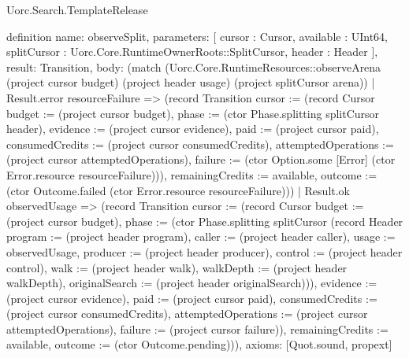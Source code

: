 \begin{lexlean}{Uorc.Search.TemplateRelease}
\begin{semanticmodule}
definition{
  name: observeSplit,
  parameters: [
    cursor : Cursor,
    available : UInt64,
    splitCursor : Uorc.Core.RuntimeOwnerRoots::SplitCursor,
    header : Header
  ],
  result: Transition,
  body: (match (Uorc.Core.RuntimeResources::observeArena (project cursor budget) (project header usage) (project splitCursor arena))
    | Result.error resourceFailure => (record Transition {cursor := (record Cursor {budget := (project cursor budget), phase := (ctor Phase.splitting splitCursor header), evidence := (project cursor evidence), paid := (project cursor paid), consumedCredits := (project cursor consumedCredits), attemptedOperations := (project cursor attemptedOperations), failure := (ctor Option.some [Error] (ctor Error.resource resourceFailure))}), remainingCredits := available, outcome := (ctor Outcome.failed (ctor Error.resource resourceFailure))})
    | Result.ok observedUsage => (record Transition {cursor := (record Cursor {budget := (project cursor budget), phase := (ctor Phase.splitting splitCursor (record Header {program := (project header program), caller := (project header caller), usage := observedUsage, producer := (project header producer), control := (project header control), walk := (project header walk), walkDepth := (project header walkDepth), originalSearch := (project header originalSearch)})), evidence := (project cursor evidence), paid := (project cursor paid), consumedCredits := (project cursor consumedCredits), attemptedOperations := (project cursor attemptedOperations), failure := (project cursor failure)}), remainingCredits := available, outcome := (ctor Outcome.pending)})),
  axioms: [Quot.sound, propext]
}


\end{semanticmodule}
\end{lexlean}
